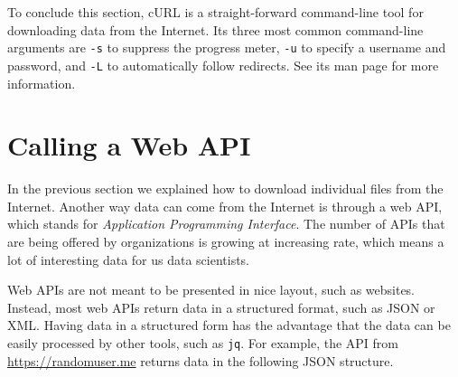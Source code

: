 \documentclass[
]{book}
\theoremstyle{definition}
\theoremstyle{definition}
\theoremstyle{definition}
\theoremstyle{remark}
\begin{document}
To conclude this section, cURL is a straight-forward command-line tool for downloading data from the Internet. Its three most common command-line arguments are \texttt{-s} to suppress the progress meter, \texttt{-u} to specify a username and password, and \texttt{-L} to automatically follow redirects. See its man page for more information.

\hypertarget{calling-a-web-api}{%
\section{Calling a Web API}\label{calling-a-web-api}}

In the previous section we explained how to download individual files from the Internet. Another way data can come from the Internet is through a web API, which stands for \emph{Application Programming Interface}. The number of APIs that are being offered by organizations is growing at increasing rate, which means a lot of interesting data for us data scientists.

Web APIs are not meant to be presented in nice layout, such as websites. Instead, most web APIs return data in a structured format, such as JSON or XML. Having data in a structured form has the advantage that the data can be easily processed by other tools, such as \texttt{jq}. For example, the API from \url{https://randomuser.me} returns data in the following JSON structure.
\end{document}
